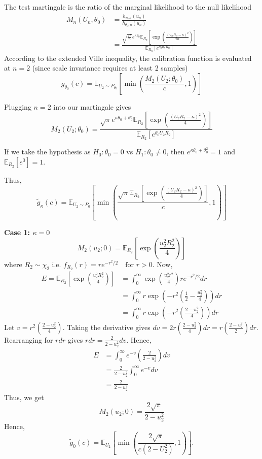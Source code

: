 \documentclass{article}%
\newcommand{\E}{\mathbb{E}}
\begin{document}
The test martingale is the ratio of the marginal likelihood to the null likelihood 
\begin{align*}
    M_n(U_n, \theta_0) & = \frac{h_{n, \kappa}(u_n)}{h_{\theta_0, n}(u_n)}\\
    & = \frac{\sqrt{\frac{2\pi}{n}} e^{\kappa\theta_0} \E_{R_n} [ \exp( \frac{(u_nR_n - \kappa)^2}{2n})]}{\E_{R_n}[e^{\theta_0 u_n R_n}]}
\end{align*}
According to the extended Ville inequality, the calibration function is evaluated at $n=2$ (since scale invariance requires at least 2 samples)
$$g_{\theta_0}(c) = \mathbb{E}_{U_2 \sim P_{\theta_0}} \left[ \min\left( \frac{M_2(U_2; \theta_0)}{c}, 1 \right) \right]$$

Plugging $n=2$ into our martingale gives
$$M_2(U_2; \theta_0) = \frac{\sqrt{\pi} e^{\kappa\theta_0 + \theta_0^2} \mathbb{E}_{R_2} \left[ \exp\left( \frac{(U_2 R_2 - \kappa)^2}{4} \right) \right]}{\mathbb{E}_{R_2}[ e^{\theta_0 U_2 R_2} ]}$$

If we take the hypothesis as $H_0: \theta_0 = 0$ vs $H_1: \theta_0 \neq 0$, then $e^{\kappa\theta_0 + \theta_0^2} = 1$ and $\mathbb{E}_{R_2}[e^0] = 1$. 

Thus, 
$$\tilde{g}_\kappa(c) = \mathbb{E}_{U_2 \sim P_0} \left[ \min\left( \frac{\sqrt{\pi} \mathbb{E}_{R_2} \left[ \exp\left( \frac{(U_2 R_2 - \kappa)^2}{4} \right) \right]}{c}, 1 \right) \right]$$

\textbf{Case 1: $\kappa = 0$}
$$M_2(u_2; 0) = \mathbb{E}_{R_2} \left[ \exp\left( \frac{u_2^2 R_2^2}{4} \right) \right]$$
where $R_2 \sim \chi_2$ i.e. $f_{R_2}(r) = r e^{-r^2/2} \quad \text{for } r > 0$.
Now,
\begin{align*}
    E = \mathbb{E}_{R_2} \left[ \exp\left( \frac{u_2^2 R_2^2}{4} \right) \right] &  = \int_{0}^{\infty} \exp\left( \frac{u_2^2 r^2}{4} \right) r e^{-r^2/2} dr\\
& = \int_{0}^{\infty} r \exp\left( -r^2 \left( \frac{1}{2} - \frac{u_2^2}{4} \right) \right) dr\\
& = \int_{0}^{\infty} r \exp\left( -r^2 \left( \frac{2 - u_2^2}{4} \right) \right) dr
\end{align*}
Let $v = r^2 \left( \frac{2 - u_2^2}{4} \right)$. Taking the derivative gives $dv = 2r \left( \frac{2 - u_2^2}{4} \right) dr = r \left( \frac{2 - u_2^2}{2} \right) dr$. Rearranging for $r dr$ gives $r dr = \frac{2}{2 - u_2^2} dv$. Hence,
\begin{align*}
    E & = \int_{0}^{\infty} e^{-v} \left( \frac{2}{2 - u_2^2} \right) dv\\
    & = \frac{2}{2 - u_2^2} \int_{0}^{\infty} e^{-v} dv\\
    & = \frac{2}{2 - u_2^2}
\end{align*}
Thus, we get 
$$M_2(u_2; 0) = \frac{2\sqrt{\pi}}{2 - u_2^2}$$
Hence,
$$\tilde{g}_0(c) = \mathbb{E}_{U_2} \left[ \min\left( \frac{2\sqrt{\pi}}{c(2 - U_2^2)}, 1 \right) \right].$$ 
\end{document}
